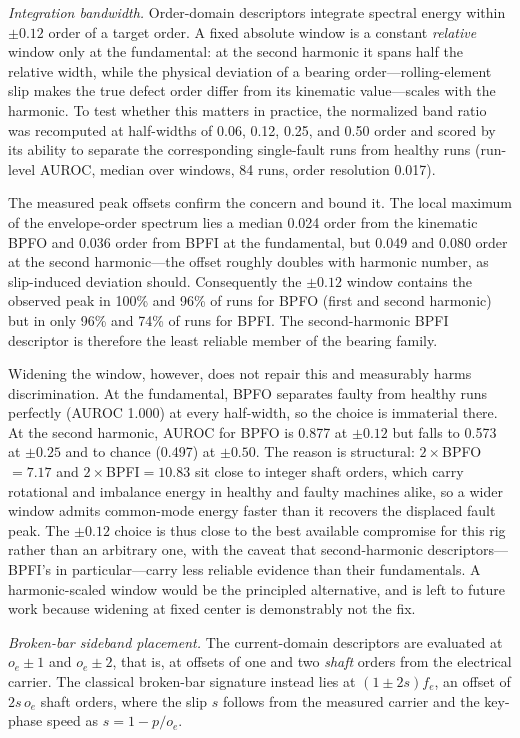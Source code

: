\emph{Integration bandwidth.} Order-domain descriptors integrate spectral
energy within $\pm0.12$ order of a target order. A fixed absolute window is a
constant \emph{relative} window only at the fundamental: at the second
harmonic it spans half the relative width, while the physical deviation of a
bearing order---rolling-element slip makes the true defect order differ from
its kinematic value---scales with the harmonic. To test whether this matters
in practice, the normalized band ratio was recomputed at half-widths of 0.06,
0.12, 0.25, and 0.50 order and scored by its ability to separate the
corresponding single-fault runs from healthy runs (run-level AUROC, median
over windows, 84 runs, order resolution 0.017).

The measured peak offsets confirm the concern and bound it. The local maximum
of the envelope-order spectrum lies a median 0.024 order from the kinematic
BPFO and 0.036 order from BPFI at the fundamental, but 0.049 and 0.080 order
at the second harmonic---the offset roughly doubles with harmonic number, as
slip-induced deviation should. Consequently the $\pm0.12$ window contains the
observed peak in 100\% and 96\% of runs for BPFO (first and second harmonic)
but in only 96\% and 74\% of runs for BPFI. The second-harmonic BPFI
descriptor is therefore the least reliable member of the bearing family.

Widening the window, however, does not repair this and measurably harms
discrimination. At the fundamental, BPFO separates faulty from healthy runs
perfectly (AUROC 1.000) at every half-width, so the choice is immaterial
there. At the second harmonic, AUROC for BPFO is 0.877 at $\pm0.12$ but falls
to 0.573 at $\pm0.25$ and to chance (0.497) at $\pm0.50$. The reason is
structural: $2\times$BPFO${}=7.17$ and $2\times$BPFI${}=10.83$ sit close to
integer shaft orders, which carry rotational and imbalance energy in healthy
and faulty machines alike, so a wider window admits common-mode energy faster
than it recovers the displaced fault peak. The $\pm0.12$ choice is thus close
to the best available compromise for this rig rather than an arbitrary one,
with the caveat that second-harmonic descriptors---BPFI's in
particular---carry less reliable evidence than their fundamentals. A
harmonic-scaled window would be the principled alternative, and is left to
future work because widening at fixed center is demonstrably not the fix.

\emph{Broken-bar sideband placement.} The current-domain descriptors are
evaluated at $o_e \pm 1$ and $o_e \pm 2$, that is, at offsets of one and two
\emph{shaft} orders from the electrical carrier. The classical broken-bar
signature instead lies at $(1 \pm 2s) f_e$, an offset of $2 s\, o_e$ shaft
orders, where the slip $s$ follows from the measured carrier and the
key-phase speed as $s = 1 - p/o_e$.

